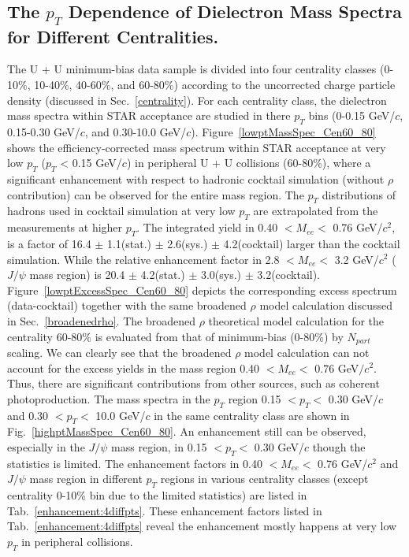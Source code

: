 \subsection{The $p_{T}$ Dependence of Dielectron Mass Spectra for Different Centralities.}
The U + U minimum-bias data sample is divided into four centrality classes (0-10\%, 10-40\%, 40-60\%, and 60-80\%) according to the uncorrected charge particle density (discussed in Sec.~\ref{centrality}). For each centrality class, the dielectron mass spectra within STAR acceptance are studied in there $p_{T}$ bins (0-0.15 GeV/$c$, 0.15-0.30 GeV/$c$, and 0.30-10.0 GeV/$c$). Figure~\ref{lowptMassSpec_Cen60_80} shows the efficiency-corrected mass spectrum within STAR acceptance at very low $p_{T}$ ($p_{T}$ < 0.15 GeV/$c$) in peripheral U + U collisions (60-80\%), where a significant enhancement with respect to hadronic cocktail simulation (without $\rho$ contribution) can be observed for the entire mass region. The $p_{T}$ distributions of hadrons used in cocktail simulation at very low $p_{T}$ are extrapolated from the measurements at higher $p_{T}$. The integrated yield in 0.40 $<M_{ee}<$ 0.76 GeV/$c^{2}$, is a factor of 16.4 $\pm$ 1.1(stat.) $\pm$ 2.6(sys.) $\pm$ 4.2(cocktail) larger than the cocktail simulation. While the relative enhancement factor in 2.8 $<M_{ee}<$ 3.2 GeV/$c^{2}$ ($J/\psi$ mass region) is 20.4 $\pm$ 4.2(stat.) $\pm$ 3.0(sys.) $\pm$ 3.2(cocktail). Figure~\ref{lowptExcessSpec_Cen60_80} depicts the corresponding excess spectrum (data-cocktail) together with the same broadened $\rho$ model calculation discussed in Sec.~\ref{broadenedrho}. The broadened $\rho$ theoretical model calculation for the centrality 60-80\% is evaluated from that of minimum-bias (0-80\%) by $N_{part}$ scaling. We can clearly see that the broadened $\rho$ model calculation can not account for the excess yields in the mass region 0.40 $<M_{ee}<$ 0.76 GeV$/c^{2}$. Thus, there are significant contributions from other sources, such as coherent photoproduction. The mass spectra in the $p_{T}$ region 0.15 $<p_{T}<$ 0.30 GeV/$c$ and 0.30 $<p_{T}<$ 10.0 GeV/$c$ in the same centrality class are shown in Fig.~\ref{highptMassSpec_Cen60_80}. An enhancement still can be observed, especially in the $J/\psi$ mass region, in 0.15 $<p_{T}<$ 0.30 GeV/$c$ though the statistics is limited. The enhancement factors in 0.40 $<M_{ee}<$ 0.76 GeV/$c^{2}$ and $J/\psi$ mass region in different $p_{T}$ regions in various centrality classes (except centrality 0-10\% bin due to the limited statistics) are listed in Tab.~\ref{enhancement:4diffpts}. These enhancement factors listed in Tab.~\ref{enhancement:4diffpts} reveal the enhancement mostly happens at very low $p_{T}$ in peripheral collisions.

